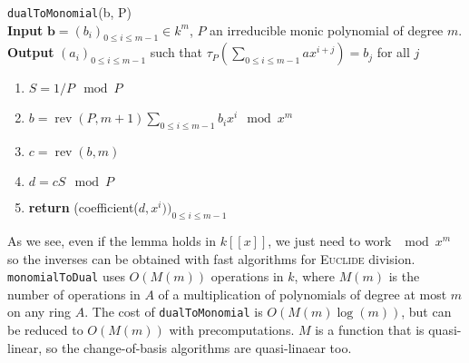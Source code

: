 \documentclass[a4paper,11pt]{article}
\theoremstyle{break}
\theoremstyle{definition}
\theoremstyle{remark}
\DeclareMathOperator{\rev}{rev}
\begin{document}
\texttt{dualToMonomial}(b, P)\\
\textbf{Input} $\textbf{b}=(b_i)_{0\leq i\leq m-1}\in k^m$, $P$ an irreducible
monic polynomial of degree $m$.\\
\textbf{Output} $(a_i)_{0\leq i \leq m-1}$ such that
$\tau_P(\sum_{0\leq i \leq m-1}ax^{i+j})=b_j$ for all $j$
\begin{enumerate}
  \item $S=1/P \mod P$
  \item $b=\rev(P,m+1)\sum_{0\leq i\leq m-1}b_ix^i\mod x^m$
  \item $c=\rev(b,m)$
  \item $d=cS \mod P$
  \item \textbf{return} (coefficient($d,x^i))_{0\leq i \leq m-1}$
\end{enumerate}

As we see, even if the lemma holds in $k[[x]]$, we just need to work $\mod x^m$
so the inverses can be obtained with fast algorithms for \textsc{Euclide}
division. \texttt{monomialToDual} uses $O(M(m))$ operations in $k$, where 
$M(m)$ is the number of operations in $A$ of a multiplication of polynomials of 
degree at most $m$ on any ring $A$. The cost of \texttt{dualToMonomial} is 
$O(M(m)\log(m))$, but can be reduced to $O(M(m))$ with precomputations. $M$ is 
a function that is quasi-linear, so the change-of-basis algorithms are 
quasi-linaear too. 
\end{document}
